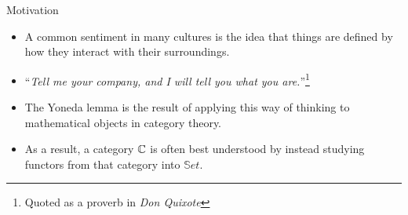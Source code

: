 \begin{frame}{Motivation}
 \begin{itemize}
  \item A common sentiment in many cultures is the idea that things are defined by how they interact with their surroundings.
  \pause\item ``\textit{Tell me your company, and I will tell you what you are.}''\footnote{Quoted as a proverb in \textit{Don Quixote}}
  \pause\item The Yoneda lemma is the result of applying this way of thinking to mathematical objects in category theory.
  \pause\item As a result, a category $\mathbb{C}$ is often best understood by instead studying functors from that category into $\mathbb{S}et$.
 \end{itemize}
\end{frame}

